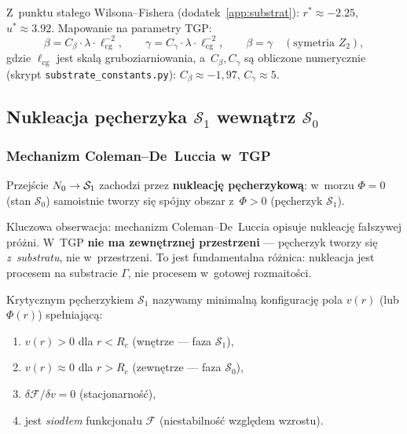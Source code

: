 Z~punktu sta\l{}ego Wilsona--Fishera (dodatek~\ref{app:substrat}):
$r^* \approx -2.25$, $u^* \approx 3.92$. Mapowanie na
parametry TGP:
\begin{equation}\label{eq:substrate-to-TGP}
    \beta = C_\beta \cdot \lambda \cdot \ell_\mathrm{cg}^{-2},
    \qquad
    \gamma = C_\gamma \cdot \lambda \cdot \ell_\mathrm{cg}^{-2},
    \qquad
    \beta = \gamma \quad (\text{symetria }Z_2),
\end{equation}
gdzie $\ell_\mathrm{cg}$ jest skal\k{a} gruboziarniowania,
a~$C_\beta, C_\gamma$ s\k{a} obliczone numerycznie
(skrypt \texttt{substrate\_constants.py}):
$C_\beta \approx -1{,}97$, $C_\gamma \approx 5$.

\subsection{Nukleacja p\k{e}cherzyka $\mathcal{S}_1$
  wewn\k{a}trz $\mathcal{S}_0$}%
\label{app:G-nukleacja}

\subsubsection{Mechanizm Coleman--De~Luccia w~TGP}

Przej\'scie $N_0 \to \mathcal{S}_1$ zachodzi przez
\textbf{nukleacj\k{e} p\k{e}cherzykow\k{a}}: w~morzu
$\Phi = 0$ (stan $\mathcal{S}_0$) samoistnie tworzy si\k{e}
sp\'ojny obszar z~$\Phi > 0$ (p\k{e}cherzyk $\mathcal{S}_1$).

Kluczowa obserwacja: mechanizm Coleman--De~Luccia
\cite{Coleman:1977py} opisuje nukleacj\k{e} fa\l{}szywej pr\'o\.zni.
W~TGP \textbf{nie ma zewn\k{e}trznej przestrzeni} ---
p\k{e}cherzyk tworzy si\k{e} \emph{z~substratu}, nie
w~przestrzeni. To jest fundamentalna r\'o\.znica:
nukleacja jest procesem na substracie $\Gamma$,
nie procesem w~gotowej rozmaito\'sci.

\begin{definition}\label{def:critical-bubble}
Krytycznym p\k{e}cherzykiem $\mathcal{S}_1$ nazywamy
minimaln\k{a} konfiguracj\k{e} pola $v(r)$ (lub $\Phi(r)$)
spe\l{}niaj\k{a}c\k{a}:
\begin{enumerate}[nosep]
  \item $v(r) > 0$ dla $r < R_c$ (wn\k{e}trze --- faza $\mathcal{S}_1$),
  \item $v(r) \approx 0$ dla $r > R_c$ (zewn\k{e}trze --- faza $\mathcal{S}_0$),
  \item $\delta \mathcal{F}/\delta v = 0$ (stacjonarno\'s\'c),
  \item jest \emph{siod\l{}em} funkcjona\l{}u $\mathcal{F}$
        (niestabilno\'s\'c wzgl\k{e}dem wzrostu).
\end{enumerate}
\end{definition}

